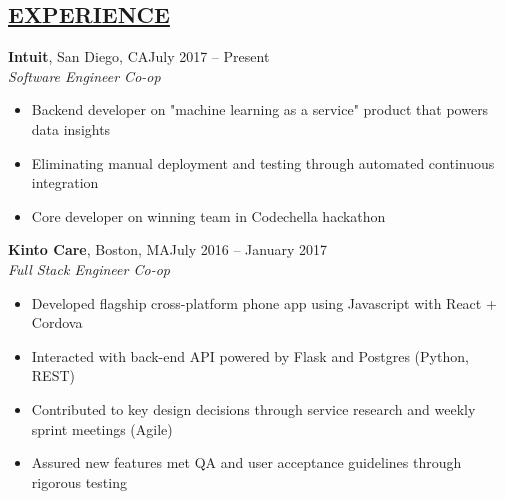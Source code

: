 \documentclass[overlapped,line]{res}
\begin{document}
\begin{resume}
\noindent\makebox[7.15in]{\rule{7.15in}{0.4pt}}

\section{\underline{EXPERIENCE}}

\textbf{Intuit}, San Diego, CA\hfill July 2017 \--- Present\\
{\sl Software Engineer Co-op}
\begin{itemize} \itemsep -2pt
\item Backend developer on "machine learning as a service" product that powers data insights
\item Eliminating manual deployment and testing through automated continuous integration
\item Core developer on winning team in Codechella hackathon
\end{itemize}

\textbf{Kinto Care}, Boston, MA\hfill July 2016 \--- January 2017\\
{\sl Full Stack Engineer Co-op}
\begin{itemize} \itemsep -2pt
\item Developed flagship cross-platform phone app using Javascript with React + Cordova
\item Interacted with back-end API powered by Flask and Postgres (Python, REST)
\item Contributed to key design decisions through service research and weekly sprint meetings (Agile)
\item Assured new features met QA and user acceptance guidelines through rigorous testing 
\end{itemize}



\end{resume}
\end{document}
